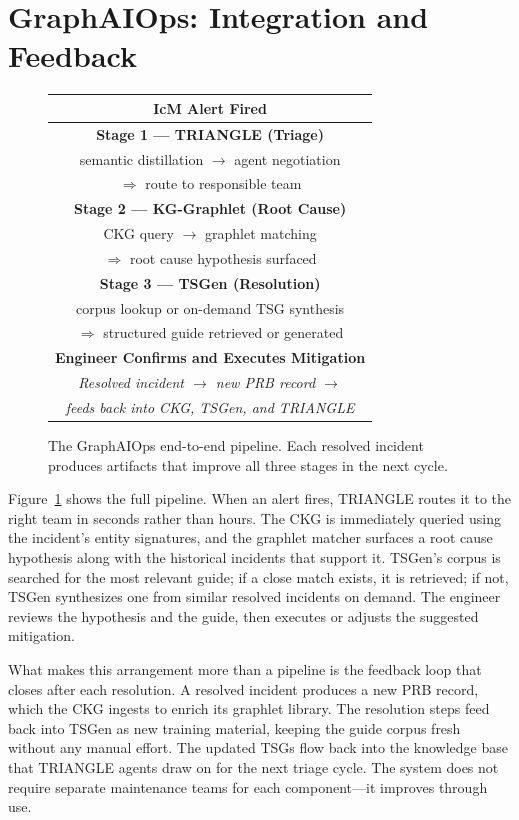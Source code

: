 \documentclass[conference]{IEEEtran}
\begin{document}
\section{GraphAIOps: Integration and Feedback}

\begin{figure}[t]
\centering
\renewcommand{\arraystretch}{1.4}
\begin{tabular}{c}
\hline
\textbf{IcM Alert Fired} \\
\hline
\textbf{Stage 1 --- TRIANGLE (Triage)} \\
semantic distillation $\rightarrow$ agent negotiation \\
$\Rightarrow$ route to responsible team \\[4pt]
\textbf{Stage 2 --- KG-Graphlet (Root Cause)} \\
CKG query $\rightarrow$ graphlet matching \\
$\Rightarrow$ root cause hypothesis surfaced \\[4pt]
\textbf{Stage 3 --- TSGen (Resolution)} \\
corpus lookup or on-demand TSG synthesis \\
$\Rightarrow$ structured guide retrieved or generated \\[4pt]
\textbf{Engineer Confirms and Executes Mitigation} \\
\hline
\textit{Resolved incident $\rightarrow$ new PRB record $\rightarrow$} \\
\textit{feeds back into CKG, TSGen, and TRIANGLE} \\
\hline
\end{tabular}
\caption{The GraphAIOps end-to-end pipeline. Each resolved incident
produces artifacts that improve all three stages in the next cycle.}
\label{fig:pipeline}
\end{figure}

Figure~\ref{fig:pipeline} shows the full pipeline. When an alert fires, TRIANGLE
routes it to the right team in seconds rather than hours. The CKG is immediately
queried using the incident's entity signatures, and the graphlet matcher surfaces
a root cause hypothesis along with the historical incidents that support it.
TSGen's corpus is searched for the most relevant guide; if a close match exists,
it is retrieved; if not, TSGen synthesizes one from similar resolved incidents
on demand. The engineer reviews the hypothesis and the guide, then executes or
adjusts the suggested mitigation.

What makes this arrangement more than a pipeline is the feedback loop that closes
after each resolution. A resolved incident produces a new PRB record, which the
CKG ingests to enrich its graphlet library. The resolution steps feed back into
TSGen as new training material, keeping the guide corpus fresh without any manual
effort. The updated TSGs flow back into the knowledge base that TRIANGLE agents
draw on for the next triage cycle. The system does not require separate maintenance
teams for each component---it improves through use.
\end{document}
